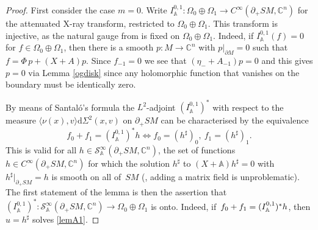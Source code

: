 \documentclass[JEP,XML,SOM,Unicode,published]{cedram}
\theoremstyle{plain}
\theoremstyle{definition}
\newcommand{\A}{\mathbb{A}}
\newcommand{\C}{\mathbb{C}}
\renewcommand{\d}{\mathrm{d}}
\newcommand{\1}{{\bf 1}}
\begin{document}
\begin{proof}
First consider the case $m=0$. Write
$
I^{0,1}_{\A}:\Omega_0\oplus\Omega_1 \to C^\infty(\partial_+SM,\C^n)
$
for the attenuated X-ray transform, restricted to $\Omega_0\oplus \Omega_1$. This transform is injective, as the natural gauge from \cite[Th.\,1.3]{PSU12} is fixed on $\Omega_0\oplus \Omega_1$. Indeed, if $I^{0,1}_{\A}(f)=0$ for $f\in\Omega_0\oplus\Omega_{1}$, then there is a smooth $p:M\to \C^n$ with $p|_{\partial M}=0$ such that $f=\Phi\,p+(X+A)p$. Since $f_{-1}=0$ we see that $(\eta_{-}+A_{-1})p=0$ and this gives $p=0$ via Lemma \ref{ogdisk} since any holomorphic function that vanishes on the boundary must be identically zero.

By means of Santaló's formula the $L^2$-adjoint $(I_\A^{0,1})^*$ with respect to the measure $\langle \nu(x),v\rangle \d \Sigma^2(x,v)$ on $\partial_+SM$ can be characterised by the equivalence
\begin{equation} \label{lemA3}
f_0 + f_1 = (I^{0,1}_\A)^* h \iff f_0=(h^\sharp)_0,~f_1 = (h^\sharp)_1.
\end{equation}
This is valid for all $h\in \mathcal{S}_\A^\infty(\partial_+SM,\C^n)$, the set of functions $h\in C^\infty(\partial_+SM,\C^n)$ for which the solution $h^\sharp$ to $(X+\A)h^\sharp \!=\! 0 $ with $h^\sharp\vert_{\partial_+SM} \!=\! h$ is smooth on all of~$SM$ (\cf \hbox{\cite[\S 5]{PSU15}}, adding a matrix field is unproblematic). The first statement of the lemma is then the assertion that $(I_\A^{0,1})^*:\mathcal{S}_\A^\infty(\partial_+SM,\C^n)\to \Omega_0\oplus\Omega_1$ is onto. Indeed, if~$f_0+\nobreak f_1 = (I_\A^{0,1})^* h$, then $u=h^\sharp$ solves \eqref{lemA1}.


\end{proof}
\end{document}
